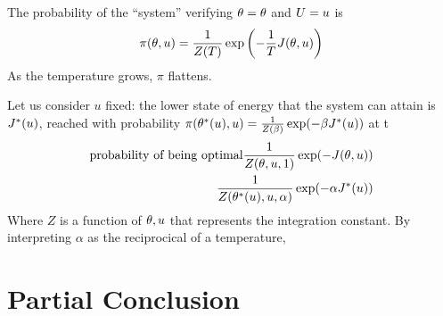 \documentclass[../../Main_ManuscritThese.tex]{subfiles}
\begin{document}
The probability of the ``system'' verifying $\theta=\theta$ and $U=u$ is
\begin{equation}
\pi(\theta, u)=\frac{1}{Z(T)}\exp\left(-\frac{1}{T}J(\theta,u)\right)
\end{equation}
As the temperature grows, $\pi$ flattens.

Let us consider $u$ fixed:
the lower state of energy that the system can attain is $J^*(u)$, reached with probability
$\pi(\theta^*(u), u) = \frac{1}{Z(\beta)}\exp(-\beta J^*(u))$ at t
\begin{align}
  \text{probability of being optimal}\frac{1}{Z(\theta, u, 1)}\exp(-J(\theta,u)) \\
  \frac{1}{Z(\theta^*(u), u, \alpha)}\exp(-\alpha J^*(u))
\end{align}
Where $Z$ is a function of $\theta,u$ that represents the integration constant.
By interpreting $\alpha$ as the reciprocical of a temperature, 


\section{Partial Conclusion}
\label{sec:ch3_partial_ccl}



\subfileLocal{
	\pagestyle{empty}
	
	
      }
\end{document}
